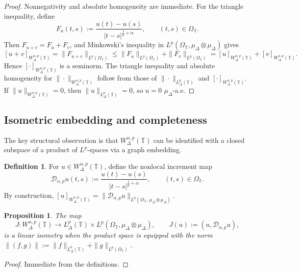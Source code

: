 \documentclass[11pt,a4paper]{article}
\numberwithin{equation}{section}
\newtheorem{proposition}[proposition]{Proposition}
\theoremstyle{definition}
\newtheorem{definition}[definition]{Definition}
\newcommand{\T}{\mathbb{T}}
\begin{document}
\begin{proof}
Nonnegativity and absolute homogeneity are immediate. For the triangle inequality, define
\[
F_u(t,s):=\frac{u(t)-u(s)}{|t-s|^{\frac1p+\alpha}},
\qquad (t,s)\in\Omega_{\T}.
\]
Then $F_{u+v}=F_u+F_v$, and Minkowski's inequality in $L^p(\Omega_{\T},\mu_\Delta\otimes\mu_\Delta)$ gives
\[
[u+v]_{W^{\alpha,p}_{\Delta}(\T)}
=
\|F_{u+v}\|_{L^p(\Omega_{\T})}
\le
\|F_u\|_{L^p(\Omega_{\T})}
+
\|F_v\|_{L^p(\Omega_{\T})}
=
[u]_{W^{\alpha,p}_{\Delta}(\T)}
+
[v]_{W^{\alpha,p}_{\Delta}(\T)}.
\]
Hence $[\cdot]_{W^{\alpha,p}_{\Delta}(\T)}$ is a seminorm. The triangle inequality and absolute homogeneity for $\|\cdot\|_{W^{\alpha,p}_{\Delta}(\T)}$ follow from those of $\|\cdot\|_{L^p_{\Delta}(\T)}$ and $[\cdot]_{W^{\alpha,p}_{\Delta}(\T)}$. If $\|u\|_{W^{\alpha,p}_{\Delta}(\T)}=0$, then $\|u\|_{L^p_{\Delta}(\T)}=0$, so $u=0$ $\mu_\Delta$-a.e.
\end{proof}

\subsection{Isometric embedding and completeness}

The key structural observation is that $W^{\alpha,p}_{\Delta}(\T)$ can be identified with a closed subspace of a product of $L^p$-spaces via a graph embedding.

\begin{definition}\label{def:kernel-map}
For $u\in W^{\alpha,p}_{\Delta}(\T)$, define the nonlocal increment map
\begin{equation}\label{eq:kernel-map}
\mathcal D_{\alpha,p}u(t,s)
:=
\frac{u(t)-u(s)}{|t-s|^{\frac1p+\alpha}},
\qquad
(t,s)\in\Omega_{\T}.
\end{equation}
By construction, $[u]_{W^{\alpha,p}_{\Delta}(\T)} = \|\mathcal D_{\alpha,p}u\|_{L^p(\Omega_{\T},\,\mu_\Delta\otimes\mu_\Delta)}$.
\end{definition}

\begin{proposition}\label{prop:embedding-graph}
The map
\[
J:W^{\alpha,p}_{\Delta}(\T)\to L^p_{\Delta}(\T)\times L^p(\Omega_{\T},\mu_\Delta\otimes\mu_\Delta),
\qquad
J(u):=(u,\mathcal D_{\alpha,p}u),
\]
is a linear isometry when the product space is equipped with the norm $\|(f,g)\|:=\|f\|_{L^p_{\Delta}(\T)}+\|g\|_{L^p(\Omega_{\T})}$.
\end{proposition}

\begin{proof}
Immediate from the definitions.
\end{proof}
\end{document}
